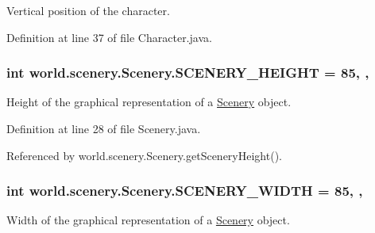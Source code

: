 Vertical position of the character. 



Definition at line 37 of file Character.\-java.

\hypertarget{a00024_a106e53ae6e1647395740237ccce7f363}{
\subsubsection[{S\-C\-E\-N\-E\-R\-Y\-\_\-\-H\-E\-I\-G\-H\-T}]{\setlength{\rightskip}{0pt plus 5cm}int world.\-scenery.\-Scenery.\-S\-C\-E\-N\-E\-R\-Y\-\_\-\-H\-E\-I\-G\-H\-T = 85\hspace{0.3cm}{\ttfamily [static]}, {\ttfamily [protected]}, {\ttfamily [inherited]}}}\label{a00024_a106e53ae6e1647395740237ccce7f363}


Height of the graphical representation of a \hyperlink{a00024}{Scenery} object. 



Definition at line 28 of file Scenery.\-java.



Referenced by world.\-scenery.\-Scenery.\-get\-Scenery\-Height().

\hypertarget{a00024_affb047c028883c6d069a03ef0f1caeb8}{
\subsubsection[{S\-C\-E\-N\-E\-R\-Y\-\_\-\-W\-I\-D\-T\-H}]{\setlength{\rightskip}{0pt plus 5cm}int world.\-scenery.\-Scenery.\-S\-C\-E\-N\-E\-R\-Y\-\_\-\-W\-I\-D\-T\-H = 85\hspace{0.3cm}{\ttfamily [static]}, {\ttfamily [protected]}, {\ttfamily [inherited]}}}\label{a00024_affb047c028883c6d069a03ef0f1caeb8}


Width of the graphical representation of a \hyperlink{a00024}{Scenery} object. 



